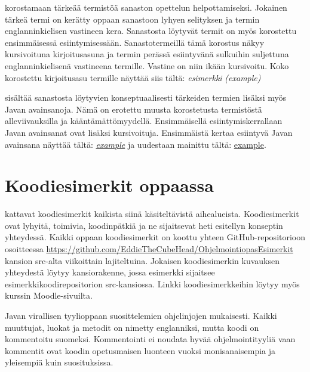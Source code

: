 \documentclass[a4paper,justified,notoc]{tufte-book}
\newcommand{\eng}[1]{\textit{(#1)}}
\newcommand{\newnogls}[1]{\textit{#1}}
\newcommand{\newengnogls}[2]{\newnogls{#1} \eng{#2}}
\newcommand{\javanogls}[1]{\underline{#1}}
\newcommand{\newjavanogls}[1]{\textit{\javanogls{#1}}}
\begin{document}
\begin{fullwidth}
 korostamaan tärkeää termistöä sanaston opettelun helpottamiseksi.
Jokainen tärkeä termi on kerätty oppaan sanastoon lyhyen selityksen ja termin englanninkielisen
vastineen kera. Sanastosta löytyvät termit on myös korostettu ensimmäisessä esiintymisessään.
Sanastotermeillä tämä korostus näkyy kursivoituna kirjoitusasuna ja termin perässä esiintyvänä
sulkuihin suljettuna englanninkielisenä vastineena termille. Vastine on niin ikään kursivoitu.
Koko korostettu kirjoitusasu termille näyttää siis tältä: \newengnogls{esimerkki}{example}

 sisältää sanastosta löytyvien konseptuaalisesti tärkeiden termien
lisäksi myös Javan avainsanoja. Nämä on erotettu muusta korostetusta termistöstä alleviivauksilla
ja kääntämättömyydellä. Ensimmäisellä esiintymiskerrallaan Javan avainsanat ovat lisäksi
kursivoituja. Ensimmäistä kertaa esiintyvä Javan avainsana näyttää tältä: \newjavanogls{example}
ja uudestaan mainittu tältä: \javanogls{example}.


\section{Koodiesimerkit oppaassa}
\label{koodiesimerkeistä}

 kattavat koodiesimerkit kaikista siinä käsiteltävistä aihealueista.
Koodiesimerkit ovat lyhyitä, toimivia, koodinpätkiä ja ne sijaitsevat heti esitellyn konseptin
yhteydessä. Kaikki oppaan koodiesimerkit on koottu yhteen GitHub-repositorioon osoitteessa
\url{https://github.com/EddieTheCubeHead/OhjelmointiopasEsimerkit} kansion src-alta viikoittain
lajiteltuina. Jokaisen koodiesimerkin kuvauksen yhteydestä löytyy kansiorakenne, jossa esimerkki
sijaitsee esimerkkikoodirepositorion src-kansiossa. Linkki koodiesimerkkeihin löytyy myös kurssin
Moodle-sivuilta.

 Javan virallisen tyylioppaan suosittelemien
ohjelinjojen mukaisesti. Kaikki muuttujat, luokat ja metodit on nimetty englanniksi, mutta koodi
on kommentoitu suomeksi. Kommentointi ei noudata hyvää ohjelmointityyliä vaan kommentit ovat
koodin opetusmaisen luonteen vuoksi monisanaisempia ja yleisempiä kuin suosituksissa.



\end{fullwidth}
\end{document}

